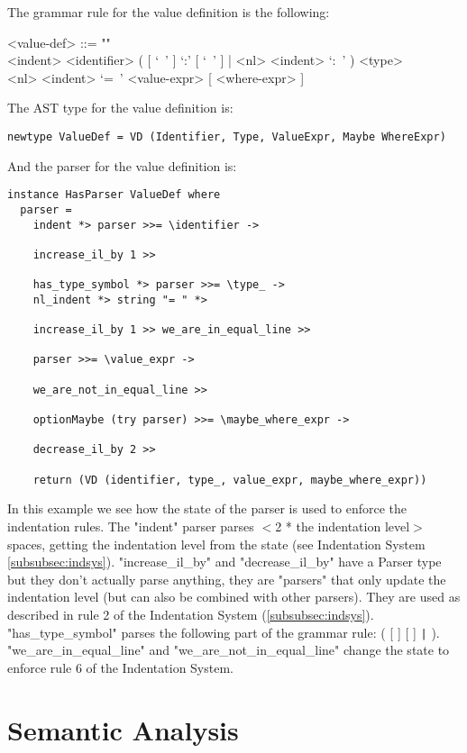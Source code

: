 \documentclass{article}
\begin{document}
The grammar rule for the value definition is the following:
\begin{grammar}
<value-def> ::= ""\\
<indent> <identifier> 
( [ `\ ' ] `:' [ `\ ' ] | <nl> <indent> `:\ ' ) <type>  \\
<nl> <indent> `=\ ' <value-expr> [ <where-expr> ]
\\
\end{grammar}
The AST type for the value definition is:
\begin{verbatim}
newtype ValueDef = VD (Identifier, Type, ValueExpr, Maybe WhereExpr)

\end{verbatim}
And the parser for the value definition is:
\begin{verbatim}
instance HasParser ValueDef where
  parser = 
    indent *> parser >>= \identifier ->

    increase_il_by 1 >>

    has_type_symbol *> parser >>= \type_ ->
    nl_indent *> string "= " *>

    increase_il_by 1 >> we_are_in_equal_line >>

    parser >>= \value_expr ->

    we_are_not_in_equal_line >>

    optionMaybe (try parser) >>= \maybe_where_expr ->

    decrease_il_by 2 >>

    return (VD (identifier, type_, value_expr, maybe_where_expr))

\end{verbatim}
In this example we see how the state of the parser is used to enforce the
indentation rules. The "indent" parser parses $<$2 * the indentation level$>$
spaces, getting the indentation level from the state (see Indentation System
\ref{subsubsec:indsys}).  "increase_il_by" and "decrease_il_by" have a Parser
type but they don't actually parse anything, they are "parsers" that only
update the indentation level (but can also be combined with other parsers).
They are used as described in rule 2 of the Indentation System
(\ref{subsubsec:indsys}). "has_type_symbol" parses the following part of 
the grammar rule:
( [ \lit{\ } ] \lit{:} [ \lit{\ } ]
\texttt{|}   \lit{:\ }).
"we_are_in_equal_line" and "we_are_not_in_equal_line" change the state 
to enforce rule 6 of the Indentation System.

\section{Semantic Analysis}
\end{document}
